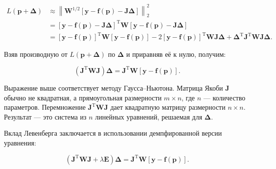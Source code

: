 $$
	\begin{aligned}
		L\left ( \mathbf{p} + \boldsymbol\Delta\right ) & \approx \left \|\boldsymbol{W}^{1/2}\left [\mathbf y - \mathbf f\left ( \mathbf{p}\right ) - \mathbf J\boldsymbol\Delta\right ]\right \|_2^2                                                                                                                                                                                                                                           \\
		& = \left [\mathbf y - \mathbf f\left ( \mathbf{p}\right ) - \mathbf J\boldsymbol\Delta \right ]^{\mathrm T}\boldsymbol{W}\left [\mathbf y - \mathbf f\left ( \mathbf{p}\right ) - \mathbf J\boldsymbol\Delta\right ]                                                                                                                                                                    \\
		 & = \left [\mathbf y - \mathbf f\left ( \mathbf{p}\right )\right ]^{\mathrm T}\boldsymbol{W}\left [\mathbf y - \mathbf f\left ( \mathbf{p}\right )\right ] - 2\left [\mathbf y - \mathbf f\left ( \mathbf{p}\right )\right ]^{\mathrm T}\boldsymbol{W} \mathbf J\boldsymbol{\Delta} + \boldsymbol{\Delta}^{\mathrm T} \mathbf J^{\mathrm T} \boldsymbol{W} \mathbf J\boldsymbol{\Delta}.
	\end{aligned}
$$

Взяв производную от $L\left ( \mathbf{p} + \boldsymbol\Delta\right )$ по $\boldsymbol{\Delta}$ и приравняв её к нулю, получим:

$$
	\left (\mathbf J^{\mathrm T} \boldsymbol{W} \mathbf J \right ) \boldsymbol\Delta = \mathbf J^{\mathrm T}\boldsymbol{W}\left [\mathbf y - \mathbf f\left ( \boldsymbol p\right )\right ].
$$


Выражение выше соответствует методу Гаусса–Ньютона. Матрица Якоби $\mathbf{J}$ обычно не квадратная, а прямоугольная размерности $m \times n$, где $n$ — количество параметров. Перемножение $\mathbf J^{\mathrm T} \boldsymbol{W} \mathbf J$ дает квадратную матрицу размерности $n \times n$. Результат — это система из $n$ линейных уравнений, решаемая для $\boldsymbol{\Delta}$.

Вклад Левенберга заключается в использовании демпфированной версии уравнения:

$$
	\left (\mathbf J^{\mathrm T} \boldsymbol{W} \mathbf J + \lambda \mathbf{E} \right ) \boldsymbol\Delta = \mathbf J^{\mathrm T}\boldsymbol{W}\left [\mathbf y - \mathbf f\left ( \boldsymbol p\right )\right ].
$$

